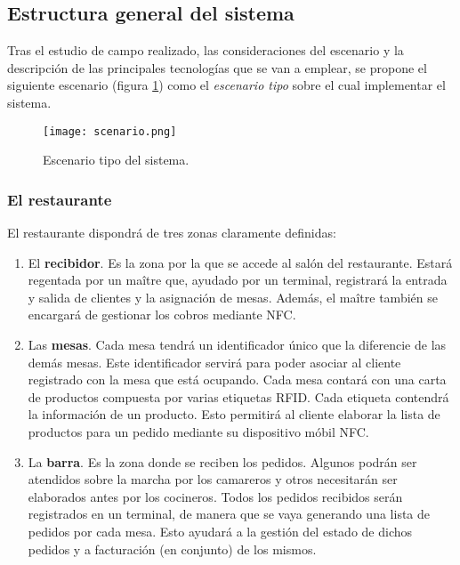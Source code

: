  \subsection{Estructura general del sistema}
Tras el estudio de campo realizado, las consideraciones del escenario y la
descripción de las principales tecnologías que se van a emplear, se propone
el siguiente escenario (figura \ref{fig:scenario}) como el \emph{escenario
tipo} sobre el cual implementar el sistema.

\begin{figure}[!h]
  \begin{center}
    \texttt{[image: scenario.png]}
    \caption{Escenario tipo del sistema.}
    \label{fig:scenario}
  \end{center}
\end{figure}

    \subsubsection{El restaurante}
  El restaurante dispondrá de tres zonas claramente definidas:
  \begin{enumerate}
  \item El \textbf{recibidor}. Es la zona por la que se accede al salón del
  restaurante. Estará regentada por un maître que, ayudado por un terminal,
  registrará la entrada y salida de clientes y la asignación de mesas.
  Además, el maître también se encargará de gestionar los cobros mediante
  \acs{NFC}.
  \item Las \textbf{mesas}. Cada mesa tendrá un identificador único que la
  diferencie de las demás mesas. Este identificador servirá para poder
  asociar al cliente registrado con la mesa que está ocupando. Cada mesa
  contará con una carta de productos compuesta por varias etiquetas
  \acs{RFID}. Cada etiqueta contendrá la información de un producto. Esto 
  permitirá al cliente elaborar la lista de productos para un pedido
  mediante su dispositivo móbil \acs{NFC}.
  \item La \textbf{barra}. Es la zona donde se reciben los pedidos. Algunos
  podrán ser atendidos sobre la marcha por los camareros y otros necesitarán
  ser elaborados antes por los cocineros. Todos los pedidos recibidos serán
  registrados en un terminal, de manera que se vaya generando una lista de
  pedidos por cada mesa. Esto ayudará a la gestión del estado de dichos 
  pedidos y a facturación (en conjunto) de los mismos.
  \end{enumerate}

